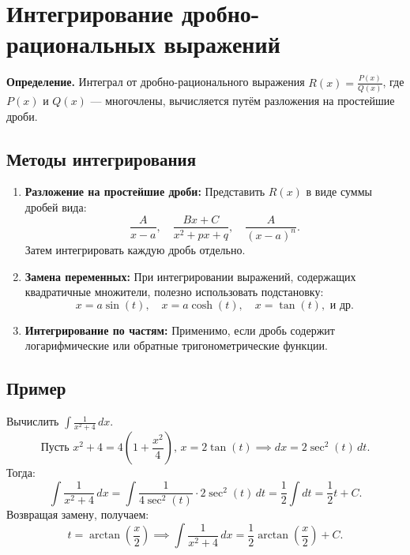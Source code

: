 \documentclass{article}
\begin{document}
\section*{Интегрирование дробно-рациональных выражений}
\textbf{Определение.} Интеграл от дробно-рационального выражения \( R(x) = \frac{P(x)}{Q(x)} \), где \( P(x) \) и \( Q(x) \) — многочлены, вычисляется путём разложения на простейшие дроби.

\subsection*{Методы интегрирования}
\begin{enumerate}
    \item \textbf{Разложение на простейшие дроби:} Представить \( R(x) \) в виде суммы дробей вида:
    \[
    \frac{A}{x - a}, \quad \frac{B x + C}{x^2 + px + q}, \quad \frac{A}{(x - a)^n}.
    \]
    Затем интегрировать каждую дробь отдельно.

    \item \textbf{Замена переменных:} При интегрировании выражений, содержащих квадратичные множители, полезно использовать подстановку:
    \[
    x = a \sin(t), \quad x = a \cosh(t), \quad x = \tan(t), \text{ и др.}
    \]

    \item \textbf{Интегрирование по частям:} Применимо, если дробь содержит логарифмические или обратные тригонометрические функции.
\end{enumerate}

\subsection*{Пример}
Вычислить \( \int \frac{1}{x^2 + 4} \, dx \).
\[
\text{Пусть } x^2 + 4 = 4(1 + \frac{x^2}{4}), \, x = 2 \tan(t) \implies dx = 2 \sec^2(t) \, dt.
\]
Тогда:
\[
\int \frac{1}{x^2 + 4} \, dx = \int \frac{1}{4 \sec^2(t)} \cdot 2 \sec^2(t) \, dt = \frac{1}{2} \int dt = \frac{1}{2} t + C.
\]
Возвращая замену, получаем:
\[
t = \arctan\left(\frac{x}{2}\right) \implies \int \frac{1}{x^2 + 4} \, dx = \frac{1}{2} \arctan\left(\frac{x}{2}\right) + C.
\]
\end{document}
